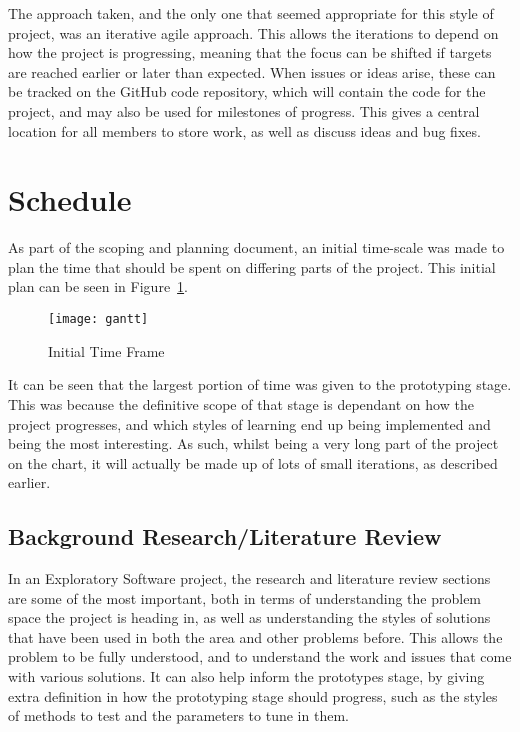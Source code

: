 The approach taken, and the only one that seemed appropriate for this style of
project, was an iterative agile approach. This allows the iterations to depend
on how the project is progressing, meaning that the focus can be shifted if
targets are reached earlier or later than expected.  When issues or ideas arise,
these can be tracked on the GitHub code repository, which will contain the code
for the project, and may also be used for milestones of progress. This gives a
central location for all members to store work, as well as discuss ideas and bug
fixes.

\section{Schedule}

As part of the scoping and planning document, an initial time-scale was made
to plan the time that should be spent on differing parts of the project.
This initial plan can be seen in Figure~\ref{fig:gantt}.

\begin{figure}[h!]
    \centering
    \texttt{[image: gantt]}
    \caption{Initial Time Frame}%
    \label{fig:gantt}
\end{figure}

It can be seen that the largest portion of time was given to the prototyping
stage. This was because the definitive scope of that stage is dependant on how
the project progresses, and which styles of learning end up being implemented and
being the most interesting. As such, whilst being a very long part of the project
on the chart, it will actually be made up of lots of small iterations, as described
earlier.

\subsection{Background Research/Literature Review}

In an Exploratory Software project, the research and literature review sections
are some of the most important, both in terms of understanding the problem
space the project is heading in, as well as understanding the styles of
solutions that have been used in both the area and other problems before.
This allows the problem to be fully understood, and to understand the work
and issues that come with various solutions. It can also help inform
the prototypes stage, by giving extra definition in how the prototyping stage
should progress, such as the styles of methods to test and the parameters to tune
in them.

